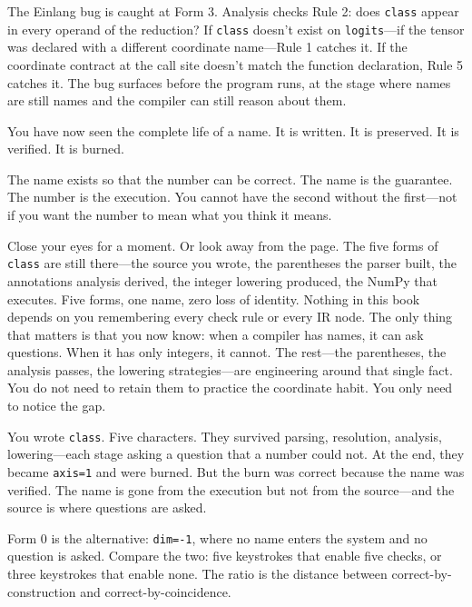 \documentclass[11pt,titlepage]{article}
\begin{document}
The Einlang bug is caught at Form 3. Analysis checks Rule 2: does
\texttt{class} appear in every operand of the reduction? If
\texttt{class} doesn't exist on \texttt{logits}---if the tensor was
declared with a different coordinate name---Rule 1 catches it. If the
coordinate contract at the call site doesn't match the function
declaration, Rule 5 catches it. The bug surfaces before the program
runs, at the stage where names are still names and the compiler can
still reason about them.

You have now seen the complete life of a name. It is written. It is
preserved. It is verified. It is burned.

The name exists so that the number can be correct. The name is the
guarantee. The number is the execution. You cannot have the second
without the first---not if you want the number to mean what you think it
means.

\vspace{2em}

Close your eyes for a moment. Or look away from the page. The five forms
of \texttt{class} are still there---the source you wrote, the
parentheses the parser built, the annotations analysis derived, the
integer lowering produced, the NumPy that executes. Five forms, one
name, zero loss of identity. Nothing in this book depends on you
remembering every check rule or every IR node. The only thing that
matters is that you now know: when a compiler has names, it can ask
questions. When it has only integers, it cannot. The rest---the
parentheses, the analysis passes, the lowering strategies---are
engineering around that single fact. You do not need to retain them to
practice the coordinate habit. You only need to notice the gap.

\vspace{2em}

You wrote \texttt{class}. Five characters. They survived parsing,
resolution, analysis, lowering---each stage asking a question that a
number could not. At the end, they became \texttt{axis=1} and were
burned. But the burn was correct because the name was verified. The name
is gone from the execution but not from the source---and the source is
where questions are asked.

Form 0 is the alternative: \texttt{dim=-1}, where no name enters the
system and no question is asked. Compare the two: five keystrokes that
enable five checks, or three keystrokes that enable none. The ratio is
the distance between correct-by-construction and correct-by-coincidence.
\end{document}
